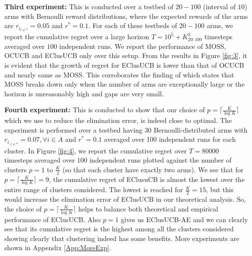\textbf{Third experiment:} This is conducted over a testbed of $20-100$ (interval of $10$) arms with Bernoulli reward distributions, where the expected rewards of the arms are $r_{i_{{i}\neq {*}}}=0.05$ and $r^{*}=0.1$. For each of these testbeds of $20-100$ arms, we report the cumulative regret over a large horizon $T=10^{5} + K_{20:100}^{3}$ timesteps averaged over $100$ independent runs. We report the performance of MOSS, OCUCB and EClusUCB only over this setup. From the results in Figure \ref{fig:3}, it is evident that the growth of regret for EClusUCB is lower than that of OCUCB and nearly same as MOSS. This corroborates the finding of \citet{lattimore2015optimally} which states that MOSS breaks down only when the number of arms are exceptionally large or the horizon is unreasonably high and gaps are very small.

\textbf{Fourth experiment:} This is conducted to show that our choice of $p=\lceil\frac{K}{\log K}\rceil$ which we use to reduce the elimination error, is indeed close to optimal. The experiment is performed over a testbed having $30$ Bernoulli-distributed arms with $r_{i_{:{{i}\neq {*}}}}=0.07,\forall i\in A$ and $r^{*}=0.1$ averaged over 100 independent runs for each cluster. In Figure \ref{fig:4}, we report the cumulative regret over $T=80000$ timesteps averaged over $100$ independent runs plotted against the number of clusters $p=1$ to $\frac{K}{2}$ (so that each cluster have exactly two arms). We see that for $p=\lceil\frac{K}{\log K}\rceil=9$, the cumulative regret of EClusuCB is almost the lowest over the entire range of clusters considered. The lowest is reached for $\frac{K}{2}=15$, but this would increase the elimination error of EClusUCB in our theoretical analysis. So, the choice of $p=\lceil\frac{K}{\log K}\rceil$ helps to balance both theoretical and empirical performance of EClusUCB. Also $p=1$ gives us EClusUCB-AE and we can clearly see that its cumulative regret is the highest among all the clusters considered showing clearly that clustering indeed has some benefits. More experiments are shown in Appendix \ref{App:MoreExp}.

